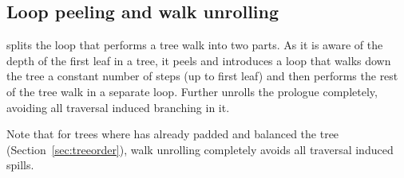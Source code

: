 \subsection{Loop peeling and walk unrolling}
\Treebeard{} splits the loop that performs a tree walk into two parts. As it is aware of the depth of the first leaf in a tree, it peels and introduces a  loop that walks down the tree a constant number of steps (up to first leaf) and then performs the rest of the tree walk in a separate loop. Further \Treebeard{} unrolls the prologue completely, avoiding all traversal induced branching in it.

Note that for trees where \Treebeard{} has already padded and balanced the tree (Section~\ref{sec:treeorder}), walk unrolling completely avoids all traversal induced spills.
